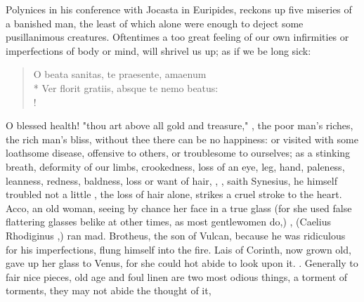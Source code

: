 Polynices in his conference with Jocasta in Euripides,
reckons up five miseries of a banished man, the least of which alone were
enough to deject some pusillanimous creatures. Oftentimes a too great feeling
of our own infirmities or imperfections of body or mind, will shrivel us up; as
if we be long sick:

\begin{latin}
\begin{verse}%
O beata sanitas, te praesente, amaenum\\*
Ver florit gratiis, absque te nemo beatus:\\!
\end{verse}%
\end{latin}

O blessed health! "thou art above all gold and treasure," , the poor man's riches, the rich man's bliss, without thee there
can be no happiness: or visited with some loathsome disease, offensive to
others, or troublesome to ourselves; as a stinking breath, deformity of our
limbs, crookedness, loss of an eye, leg, hand, paleness, leanness, redness,
baldness, loss or want of hair, \etc{}, , saith Synesius, he himself troubled not a
little , the loss of hair alone, strikes a cruel stroke
to the heart. Acco, an old woman, seeing by chance her face in a true glass
(for she used false flattering glasses belike at other times, as most
gentlewomen do,) , (Caelius Rhodiginus
,) ran mad. Brotheus,
the son of Vulcan, because he was ridiculous for his imperfections, flung
himself into the fire. Lais of Corinth, now grown old, gave up her glass to
Venus, for she could hot abide to look upon it. . Generally to fair nice pieces, old age and foul
linen are two most odious things, a torment of torments, they may not abide the
thought of it,


